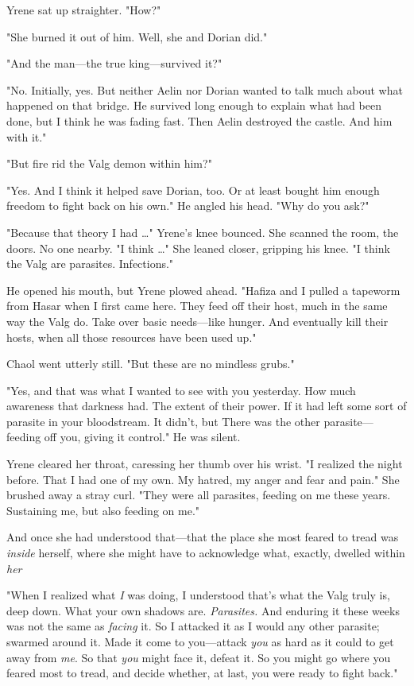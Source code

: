 Yrene sat up straighter. "How?"

"She burned it out of him. Well, she and Dorian did."

"And the man---the true king---survived it?"

"No. Initially, yes. But neither Aelin nor Dorian wanted to talk much about what happened on that bridge. He survived long enough to explain what had been done, but I think he was fading fast. Then Aelin destroyed the castle. And him with it."

"But fire rid the Valg demon within him?"

"Yes. And I think it helped save Dorian, too. Or at least bought him enough freedom to fight back on his own." He angled his head. "Why do you ask?"

"Because that theory I had \ldots" Yrene's knee bounced. She scanned the room, the doors. No one nearby. "I think \ldots" She leaned closer, gripping his knee. "I think the Valg are parasites. Infections."

He opened his mouth, but Yrene plowed ahead. "Hafiza and I pulled a tapeworm from Hasar when I first came here. They feed off their host, much in the same way the Valg do. Take over basic needs---like hunger. And eventually kill their hosts, when all those resources have been used up."

Chaol went utterly still. "But these are no mindless grubs."

"Yes, and that was what I wanted to see with you yesterday. How much awareness that darkness had. The extent of their power. If it had left some sort of parasite in your bloodstream. It didn't, but  There was the other parasite--- feeding off you, giving it control." He was silent.

Yrene cleared her throat, caressing her thumb over his wrist. "I realized the night before. That I had one of my own. My hatred, my anger and fear and pain." She brushed away a stray curl. "They were all parasites, feeding on me these years. Sustaining me, but also feeding on me."

And once she had understood that---that the place she most feared to tread was \emph{inside} herself, where she might have to acknowledge what, exactly, dwelled within \emph{her} 

"When I realized what \emph{I} was doing, I understood that's what the Valg truly is, deep down. What your own shadows are. \emph{Parasites.}
And enduring it these weeks was not the same as \emph{facing} it. So I attacked it as I would any other parasite; swarmed around it. Made it come to you---attack \emph{you} as hard as it could to get away from
\emph{me}. So that \emph{you} might face it, defeat it. So you might go where you feared most to tread, and decide whether, at last, you were ready to fight back."

